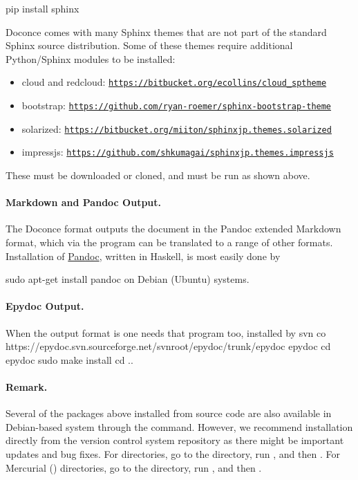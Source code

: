 \documentclass[%
oneside,                 %
final,                   %
10pt]{article}
\begin{document}
\bsys
pip install sphinx
\esys

Doconce comes with many Sphinx themes that are not part of the
standard Sphinx source distribution. Some of these themes require
additional Python/Sphinx modules to be installed:

\begin{itemize}
 \item cloud and redcloud: \href{{https://bitbucket.org/ecollins/cloud_sptheme}}{\nolinkurl{https://bitbucket.org/ecollins/cloud_sptheme}}

 \item bootstrap: \href{{https://github.com/ryan-roemer/sphinx-bootstrap-theme}}{\nolinkurl{https://github.com/ryan-roemer/sphinx-bootstrap-theme}}

 \item solarized: \href{{https://bitbucket.org/miiton/sphinxjp.themes.solarized}}{\nolinkurl{https://bitbucket.org/miiton/sphinxjp.themes.solarized}}

 \item impressjs: \href{{https://github.com/shkumagai/sphinxjp.themes.impressjs}}{\nolinkurl{https://github.com/shkumagai/sphinxjp.themes.impressjs}}
\end{itemize}

\noindent
These must be downloaded or cloned, and  must be run as shown
above.

\paragraph{Markdown and Pandoc Output.}
The Doconce format  outputs the document in the Pandoc
extended Markdown format, which via the  program can be
translated to a range of other formats. Installation of \href{{http://johnmacfarlane.net/pandoc/}}{Pandoc}, written in Haskell, is most
easily done by

\bsys
sudo apt-get install pandoc
\esys
on Debian (Ubuntu) systems.

\paragraph{Epydoc Output.}
When the output format is  one needs that program too, installed
by
\bsys
svn co https://epydoc.svn.sourceforge.net/svnroot/epydoc/trunk/epydoc epydoc
cd epydoc
sudo make install
cd ..
\esys

\paragraph{Remark.}
Several of the packages above installed from source code
are also available in Debian-based system through the
 command. However, we recommend installation directly
from the version control system repository as there might be important
updates and bug fixes. For  directories, go to the directory,
run , and then . For
Mercurial () directories, go to the directory, run
, and then .
\end{document}
